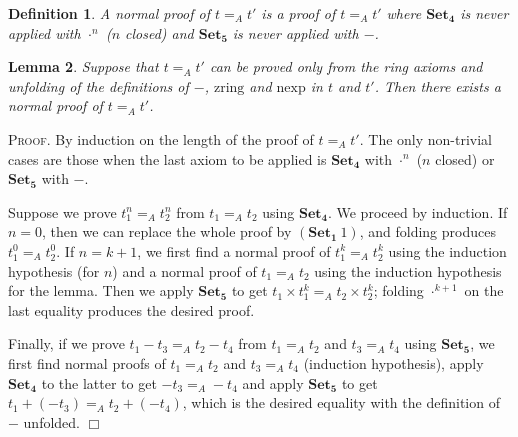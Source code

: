 \documentclass{article}
\newtheorem{definition}{Definition}[section]
\newtheorem{lemma}[definition]{Lemma}
\newenvironment{proof}{\smallskip\textsc{Proof.}}{\hspace*{\fill}$\Box$}
\newcommand{\zring}{\ensuremath{\mathrm{zring}}}
\newcommand{\nexp}{\ensuremath{\mathrm{nexp}}}
\newcommand{\axiom}[1]{\ensuremath{\mathbf{#1}}}
\begin{document}
\begin{definition}\label{defn:normalproof} A \emph{normal proof} of $t=_A t'$
is a proof of $t=_A t'$ where \axiom{Set_4} is never applied with
$\cdot^n$ ($n$ closed) and \axiom{Set_5} is never applied with $-$.
\end{definition}

\begin{lemma}\label{normalproof} Suppose that $t=_A t'$ can be proved
only from the ring axioms and unfolding of the definitions of $-$,
$\zring$ and $\nexp$ in $t$ and $t'$.  Then there exists a normal proof
of $t=_A t'$.
\end{lemma}
\begin{proof}
By induction on the length of the proof of $t=_A t'$.  The only non-trivial
cases are those when the last axiom to be applied is \axiom{Set_4} with
$\cdot^n$ ($n$ closed) or \axiom{Set_5} with $-$.

Suppose we prove $t_1^n=_A t_2^n$ from $t_1=_A t_2$ using
\axiom{Set_4}.  We proceed by induction.  If $n=0$, then we can
replace the whole proof by $(\axiom{Set_1}\ 1)$, and folding produces
$t_1^0=_A t_2^0$.  If $n=k+1$, we first find a normal proof of
$t_1^k=_A t_2^k$ using the induction hypothesis (for $n$) and a normal
proof of $t_1=_A t_2$ using the induction hypothesis for the lemma.
Then we apply \axiom{Set_5} to get $t_1\times t_1^k=_A t_2\times
t_2^k$; folding $\cdot^{k+1}$ on the last equality produces the
desired proof.

Finally, if we prove $t_1-t_3=_A t_2-t_4$ from $t_1=_A t_2$ and
$t_3=_A t_4$ using \axiom{Set_5}, we first find normal proofs of
$t_1=_A t_2$ and $t_3=_A t_4$ (induction hypothesis), apply \axiom{Set_4}
to the latter to get $-t_3=_A -t_4$ and apply \axiom{Set_5} to get
$t_1+(-t_3)=_A t_2+(-t_4)$, which is the desired equality with the
definition of $-$ unfolded.
\end{proof}
\end{document}
